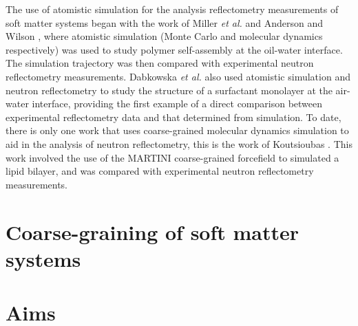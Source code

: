 The use of atomistic simulation for the analysis reflectometry measurements of soft matter systems began with the work of Miller \emph{et al.} and Anderson and Wilson \cite{miller_monte_2003}, where atomistic simulation (Monte Carlo and molecular dynamics respectively) was used to study polymer self-assembly at the oil-water interface. 
The simulation trajectory was then compared with experimental neutron reflectometry measurements. 
Dabkowska \emph{et al.} also used atomistic simulation and neutron reflectometry to study the structure of a surfactant monolayer at the air-water interface, providing the first example of a direct comparison between experimental reflectometry data and that determined from simulation. 
To date, there is only one work that uses coarse-grained molecular dynamics simulation to aid in the analysis of neutron reflectometry, this is the work of Koutsioubas \cite{koutsioubas_combined_2016}. 
This work involved the use of the MARTINI coarse-grained forcefield to simulated a lipid bilayer, and was compared with experimental neutron reflectometry measurements. 

\section{Coarse-graining of soft matter systems}

\section{Aims}
